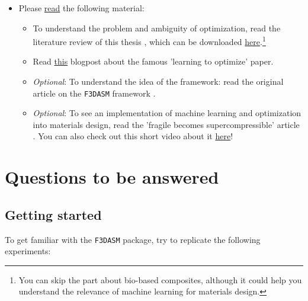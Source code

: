 \documentclass[10pt,a4paper,twoside]{article} %
\def\code#1{\texttt{#1}}
\begin{document}
\begin{itemize}
	\item Please \underline{read} the following material:
	
	\begin{itemize}
		
		\item To understand the problem and ambiguity of optimization, read the literature review of this thesis \cite{Schelling2021}, which can be downloaded \href{https://repository.tudelft.nl/islandora/object/uuid\%3Ad58271d6-21bb-470c-a5ee-4584b3b8ee29?collection=education}{here}.\footnote{You can skip the part about bio-based composites, although it could help you understand the relevance of machine learning for materials design.}
		
		\item Read \href{https://bair.berkeley.edu/blog/2017/09/12/learning-to-optimize-with-rl/}{this} blogpost about the famous 'learning to optimize' paper.
		\
		\item \textit{Optional}: To understand the idea of the framework: read the original article on the \code{F3DASM} framework \cite{Bessa2017}.
		
		\item \textit{Optional}: To see an implementation of machine learning and optimization into materials design, read the 'fragile becomes supercompressible' article \cite{Bessa2019}. You can also check out this short video about it \href{https://www.youtube.com/watch?v=cWTWHhMAu7I}{here}!
		
	\end{itemize}
	
\end{itemize}

\section*{Questions to be answered}

\vspace{5mm}

\subsection*{Getting started}

To get familiar with the \code{F3DASM} package, try to replicate the following experiments:
\end{document}
